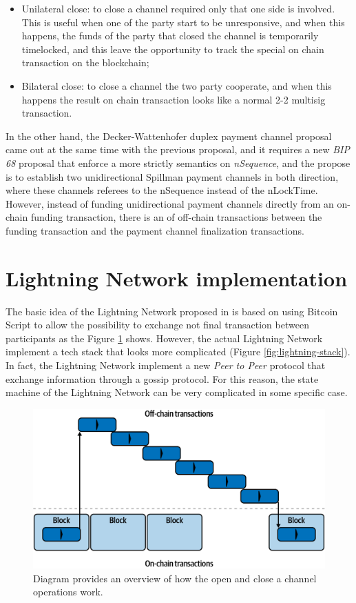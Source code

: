 \begin{itemize}
  \item Unilateral close: to close a channel required only that one side is involved. This is useful when one
        of the party start to be unresponsive, and when this happens, the funds of
        the party that closed the channel is temporarily timelocked, and this leave the opportunity to
        track the special on chain transaction on the blockchain;
  \item Bilateral close: to close a channel the two party cooperate, and when this happens the result
        on chain transaction looks like a normal 2-2 multisig transaction.
\end{itemize}

In the other hand, the Decker-Wattenhofer duplex payment channel proposal came out at the same time with the previous proposal, and
it requires a new \emph{BIP 68}\cite{bip68} proposal that enforce a more strictly semantics on \emph{nSequence}, and the propose is to
establish two unidirectional Spillman payment channels in both
direction, where these channels referees to the nSequence instead of the nLockTime.\\
However, instead of funding unidirectional payment channels directly from an on-chain funding transaction, there is an  of off-chain transactions between the funding transaction and the payment channel finalization transactions.

\section{Lightning Network implementation}

The basic idea of the Lightning Network proposed in \cite{lightning-network-paper} is based on using Bitcoin Script
to allow the possibility to exchange not final transaction between participants as the Figure \ref{fig:ln-onchain} shows.
However, the actual Lightning Network implement a tech stack that looks more complicated (Figure \ref{fig:lightning-stack}).\\
In fact, the Lightning Network implement a new \emph{Peer to Peer} protocol that exchange information through
a gossip protocol. For this reason, the state machine of the Lightning Network
can be very complicated in some specific case.

\begin{figure}[h]
  \begin{center}
  \includegraphics[width=0.6\columnwidth]{imgs/mtln_0702.png}
  \end{center}
  \caption{Diagram provides an overview of how the open and close a channel operations work.}
  \label{fig:ln-onchain}
\end{figure}



